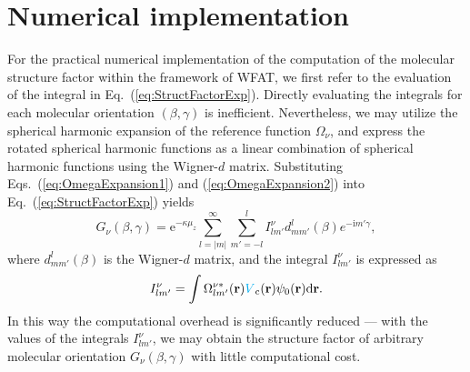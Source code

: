 \documentclass[preprint,12pt]{elsarticle} %
\newcommand{\bn}[1]{\mathbf{#1}}    %
\renewcommand{\rm}[1]{\mathrm{#1}}    %
\newcommand{\dd}{\mathrm{d}}    %
\newcommand{\ii}{\mathrm{i}}    %
\newcommand{\ee}{\mathrm{e}}    %
\newcommand{\cyan}[1]{\textcolor{cyan}{#1}}     %
\begin{document}
\section{Numerical implementation}
\label{sec:numerical}

For the practical numerical implementation of the computation of the molecular structure factor within the framework of WFAT, we first refer to the evaluation of the integral in Eq.~(\ref{eq:StructFactorExp}). Directly evaluating the integrals for each molecular orientation $(\beta,\gamma)$ is inefficient. Nevertheless, we may utilize the spherical harmonic expansion of the reference function $\Omega_\nu$, and express the rotated spherical harmonic functions as a linear combination of spherical harmonic functions using the Wigner-$d$ matrix. Substituting Eqs.~(\ref{eq:OmegaExpansion1}) and (\ref{eq:OmegaExpansion2}) into Eq.~(\ref{eq:StructFactorExp}) yields \cite{madsen_structure_2017}
\begin{equation}
    G_\nu(\beta,\gamma) = \ee^{-\kappa \mu_z} \sum_{l=|m|}^{\infty} \sum_{m'=-l}^l I_{l m'}^\nu  d_{m m'}^l(\beta) e^{-\ii m' \gamma},
    \label{eq:StructFactorExpInt}
\end{equation}
where $d_{m m'}^l(\beta)$ is the Wigner-$d$ matrix, and the integral $I_{l m'}^\nu$ is expressed as
\begin{equation}
    I_{l m'}^\nu = \int \Omega_{l m'}^{\nu *}(\bn{r}) \cyan{V}_{\rm{c}}(\bn{r}) \psi_0(\bn{r}) \dd \bn{r}.
    \label{eq:IntegralExpr}
\end{equation}
In this way the computational overhead is significantly reduced --- with the values of the integrals $I_{l m'}^\nu$, we may obtain the structure factor of arbitrary molecular orientation $G_\nu(\beta,\gamma)$ with little computational cost.
\end{document}
